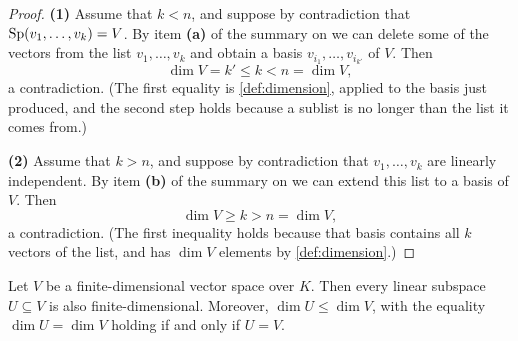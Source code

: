 \begin{proof}
\textbf{(1)} Assume that $k < n$, and suppose by contradiction that $\operatorname{Sp}(v_1, \dots, v_k) = V$. By item \textbf{(a)} of the summary on  we can delete some of the vectors from the list $v_1, \dots, v_k$ and obtain a basis $v_{i_1}, \dots, v_{i_{k'}}$ of $V$. Then
\[
\dim V = k' \le k < n = \dim V,
\]
a contradiction. (The first equality is \cref{def:dimension}, applied to the basis just produced, and the second step holds because a sublist is no longer than the list it comes from.)

\textbf{(2)} Assume that $k > n$, and suppose by contradiction that $v_1, \dots, v_k$ are linearly independent. By item \textbf{(b)} of the summary on  we can extend this list to a basis of $V$. Then
\[
\dim V \ge k > n = \dim V,
\]
a contradiction. (The first inequality holds because that basis contains all $k$ vectors of the list, and has $\dim V$ elements by \cref{def:dimension}.)
\end{proof}

\begin{proposition}
\label{prop:subspace_dimension_constraints}
Let $V$ be a finite-di\-men\-sional vector space over $K$. Then every linear subspace $U \subseteq V$ is also finite-di\-men\-sional. Moreover, $\dim U \le \dim V$, with the equality $\dim U = \dim V$ holding if and only if $U = V$.
\end{proposition}

